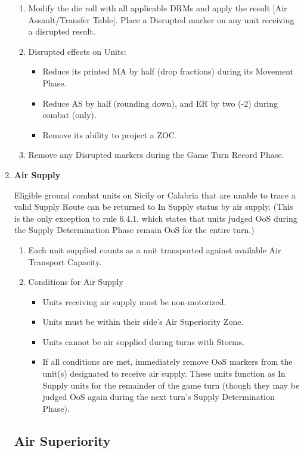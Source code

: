 \begin{enumerate}[label=\alph*.]
\begin{enumerate}[label=\arabic*)]
        \item Modify the die roll with all applicable DRMs and apply the result [Air Assault/Transfer Table]. Place a Disrupted marker on any unit receiving a disrupted result.
        \item Disrupted effects on Units:
        \begin{itemize}
            \item Reduce its printed MA by half (drop fractions) during its Movement Phase.
            \item Reduce AS by half (rounding down), and ER by two (-2) during combat (only).
            \item Remove its ability to project a ZOC.
        \end{itemize}
        \item Remove any Disrupted markers during the Game Turn Record Phase.
    \end{enumerate}
    \item \textbf{Air Supply}
    \par
    Eligible ground combat units on Sicily or Calabria that are unable to trace a valid Supply Route can be returned to In Supply status by air supply. (This is the only exception to rule 6.4.1, which states that units judged OoS during the Supply Determination Phase remain OoS for the entire turn.)
    \begin{enumerate}[label=\arabic*)]
        \item Each unit supplied counts as a unit transported against available Air Transport Capacity.
        \item Conditions for Air Supply
        \begin{itemize}
            \item Units receiving air supply must be non-motorized.
            \item Units must be within their side's Air Superiority Zone.
            \item Units cannot be air supplied during turns with Storms.
            \item If all conditions are met, immediately remove OoS markers from the unit(s) designated to receive air supply. These units function as In Supply units for the remainder of the game turn (though they may be judged OoS again during the next turn's Supply Determination Phase).
        \end{itemize}
    \end{enumerate}
    \subsection{Air Superiority}

\end{enumerate}
